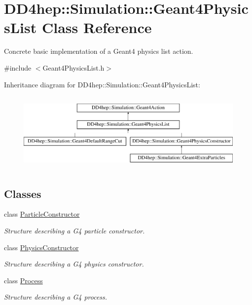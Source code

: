 \hypertarget{class_d_d4hep_1_1_simulation_1_1_geant4_physics_list}{}\section{D\+D4hep\+:\+:Simulation\+:\+:Geant4\+Physics\+List Class Reference}
\label{class_d_d4hep_1_1_simulation_1_1_geant4_physics_list}


Concrete basic implementation of a Geant4 physics list action.  




{\ttfamily \#include $<$Geant4\+Physics\+List.\+h$>$}

Inheritance diagram for D\+D4hep\+:\+:Simulation\+:\+:Geant4\+Physics\+List\+:\begin{figure}[H]
\begin{center}
\leavevmode
\includegraphics[height=3.929825cm]{class_d_d4hep_1_1_simulation_1_1_geant4_physics_list}
\end{center}
\end{figure}
\subsection*{Classes}
\begin{DoxyCompactItemize}
\item 
class \hyperlink{class_d_d4hep_1_1_simulation_1_1_geant4_physics_list_1_1_particle_constructor}{Particle\+Constructor}
\begin{DoxyCompactList}\small\item\em Structure describing a G4 particle constructor. \end{DoxyCompactList}\item 
class \hyperlink{class_d_d4hep_1_1_simulation_1_1_geant4_physics_list_1_1_physics_constructor}{Physics\+Constructor}
\begin{DoxyCompactList}\small\item\em Structure describing a G4 physics constructor. \end{DoxyCompactList}\item 
class \hyperlink{class_d_d4hep_1_1_simulation_1_1_geant4_physics_list_1_1_process}{Process}
\begin{DoxyCompactList}\small\item\em Structure describing a G4 process. \end{DoxyCompactList}\end{DoxyCompactItemize}
